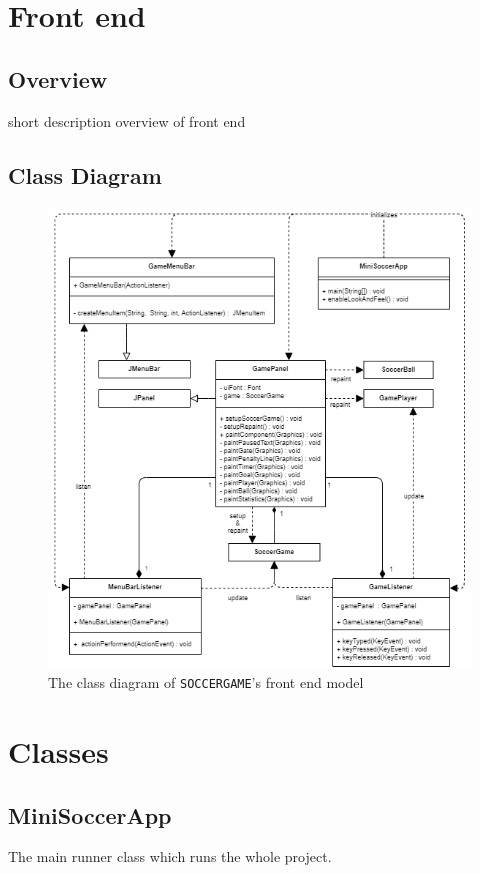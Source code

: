 \documentclass[12pt, dvipsnames, a4paper]{article}
\newcommand{\code}[1]{\texttt{#1}}
\begin{document}
\section{Front end}
\subsection{Overview}
short description overview of front end
\subsection{Class Diagram}
\begin{center}
	\begin{figure}[H]
		\hspace{-20pt}
		\includegraphics[scale=1]{diagrams/class-diagrams/gui-model/gui-model-cd.png}
		\caption{The class diagram of \code{SOCCERGAME}'s front end model}
		\label{fig:frontend}
	\end{figure}
\end{center}
\clearpage

\section{Classes}
\subsection{MiniSoccerApp}
The main runner class which runs the whole project.
\end{document}
